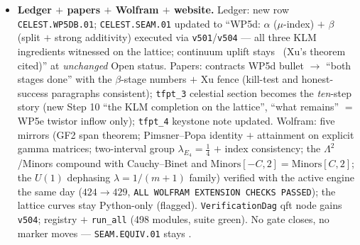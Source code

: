 \begin{itemize}[leftmargin=1.5em]
$\{\sigma_a\sigma_b\}$, $2.8\times10^{-14}$) --- the same ladder at doubled rate (Longo heredity,
\mC). \emph{Pimsner--Popa, exact}: $E(a)-a/2=PaP/2$ identically; attainment in integers (all
$16384$ (even, odd) monomial pairs at $N=8$: $8192$ extremal with $M^2=4$, $\operatorname{Tr}M=0$,
$PMP=-M$, $0$ violations; $2048/2048$ at $N=12$; pencil $\min\lambda=0.5000000000$);
$\lambda_{E_4}=\tfrac14=1/\mu$; index consistency $e^{\Delta_\infty}=2.000000000=
1/\lambda_{\mathrm{PP}}$ and $e^{2\Delta_\infty}=4=\mu$; $U(1)$: $\lambda=1/(m{+}1)\to0$.
\emph{Controls $+$ honesty}: dimerised phase trivial (drift $3.6\times10^{-15}$); wrong prescription
$\{1,P_{AB}\}$ deficit exactly $0$; $\Z_2$ finite-size honesty ($14.9\%$ below $\ln2$ at $N=4096$
--- witness, not proof). VERDICT: with \texttt{v501} all THREE KLM ingredients of complete
rationality are witnessed on the lattice; the continuum theorem for finite-group orbifolds is
\emph{Xu's} (cited, not claimed), the concrete seam quotient net and the condensed $(E_8)_1$ net
stay WP5e/Costello--Li.
\item \textbf{Ledger $+$ papers $+$ Wolfram $+$ website.} Ledger: new row \texttt{CELEST.WP5DB.01};
\texttt{CELEST.SEAM.01} updated to ``WP5d: $\alpha$ ($\mu$-index) $+$ $\beta$ (split $+$ strong
additivity) executed via \texttt{v501}/\texttt{v504} --- all three KLM ingredients witnessed on the
lattice; continuum uplift stays \mO\ (Xu's theorem cited)'' at \emph{unchanged} Open status. Papers:
contracts WP5d bullet $\to$ ``both stages done'' with the $\beta$-stage numbers $+$ Xu fence
(kill-test and honest-success paragraphs consistent); \texttt{tfpt\_3} celestial section becomes the
\emph{ten}-step story (new Step 10 ``the KLM completion on the lattice'', ``what remains'' $=$ WP5e
twistor inflow only); \texttt{tfpt\_4} keystone note updated. Wolfram: five mirrors (GF2 span
theorem; Pimsner--Popa identity $+$ attainment on explicit gamma matrices; two-interval group
$\lambda_{E_4}=\tfrac14$ $+$ index consistency; the $\Lambda^2$/Minors compound with Cauchy--Binet
and $\mathrm{Minors}[-C,2]=\mathrm{Minors}[C,2]$; the $U(1)$ dephasing $\lambda=1/(m{+}1)$ family)
verified with the active engine the same day ($424\to429$, \texttt{ALL WOLFRAM EXTENSION CHECKS
PASSED}); the lattice curves stay Python-only (flagged). \texttt{VerificationDag} qft node gains
\texttt{v504}; registry $+$ \texttt{run\_all} (498 modules, suite green). No gate closes, no marker
moves --- \texttt{SEAM.EQUIV.01} stays \mO.
\end{itemize}

